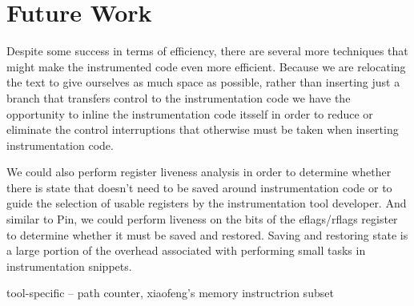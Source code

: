 \section{Future Work}

Despite some success in terms of efficiency, there are several more techniques
that might make the instrumented code even more efficient. Because we are relocating
the text to give ourselves as much space as possible, rather than inserting just a branch
that transfers control to the instrumentation code we have the opportunity to inline
the instrumentation code itsself in order to reduce  or eliminate the control interruptions
that otherwise must be taken when inserting instrumentation code.

We could also perform register liveness analysis in order to determine whether there is
state that doesn't need to be saved around instrumentation code or to guide the selection
of usable registers by the instrumentation tool developer. And similar to Pin, we could perform
liveness on the bits of the eflags/rflags register to determine whether it must be saved and
restored. Saving and restoring state is a large portion of the overhead associated with performing
small tasks in instrumentation snippets.

tool-specific -- path counter, xiaofeng's memory instructrion subset